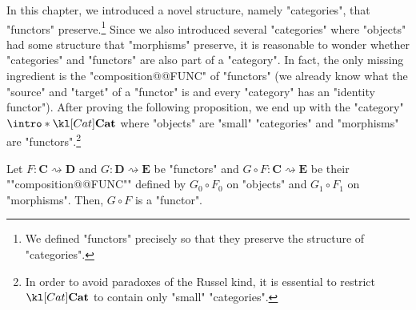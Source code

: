 \documentclass[main.tex]{subfiles}
\begin{document}
In this chapter, we introduced a novel structure, namely "categories", that "functors" preserve.\footnote{We defined "functors" precisely so that they preserve the structure of "categories".} Since we also introduced several "categories" where "objects" had some structure that "morphisms" preserve, it is reasonable to wonder whether "categories" and "functors" are also part of a "category". In fact, the only missing ingredient is the "composition@@FUNC" of "functors" (we already know what the "source" and "target" of a "functor" is and every "category" has an "identity functor"). After proving the following proposition, we end up with the "category" $\intro*\catCat$ where "objects" are "small" "categories" and "morphisms" are "functors".\footnote{In order to avoid paradoxes of the Russel kind, it is essential to restrict $\catCat$ to contain only "small" "categories".}
\begin{prop}
	\AP Let $F:\mathbf{C}\rightsquigarrow \mathbf{D}$ and $G: \mathbf{D}\rightsquigarrow \mathbf{E}$ be "functors" and $G \circ F:\mathbf{C} \rightsquigarrow \mathbf{E}$ be their ""composition@@FUNC"" defined by $G_0 \circ F_0$ on "objects" and $G_1 \circ F_1$ on "morphisms". Then, $G \circ F$ is a "functor".
\end{prop}
\end{document}
